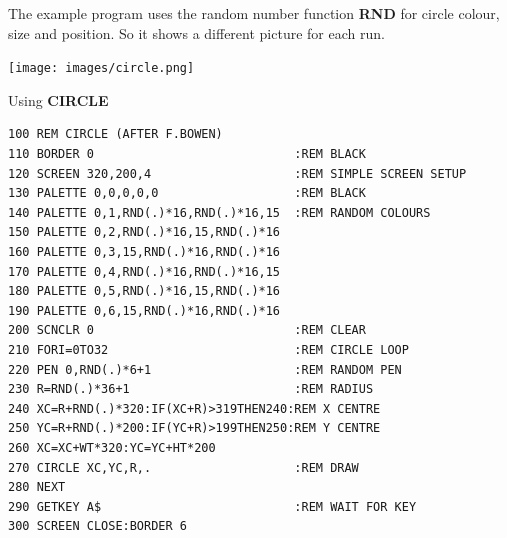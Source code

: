 \begin{description}[leftmargin=2cm,style=nextline]
               The example program uses the random number function
               {\bf RND} for circle colour, size and position.
               So it shows a different picture for each run.

\item \begin{center}\texttt{[image: images/circle.png]}\end{center}
\newpage

\item [Example:] Using {\bf CIRCLE}
\begin{tcolorbox}[colback=black,coltext=white]
\verbatimfont{\codefont}
\begin{verbatim}
100 REM CIRCLE (AFTER F.BOWEN)
110 BORDER 0                            :REM BLACK
120 SCREEN 320,200,4                    :REM SIMPLE SCREEN SETUP
130 PALETTE 0,0,0,0,0                   :REM BLACK
140 PALETTE 0,1,RND(.)*16,RND(.)*16,15  :REM RANDOM COLOURS
150 PALETTE 0,2,RND(.)*16,15,RND(.)*16
160 PALETTE 0,3,15,RND(.)*16,RND(.)*16
170 PALETTE 0,4,RND(.)*16,RND(.)*16,15
180 PALETTE 0,5,RND(.)*16,15,RND(.)*16
190 PALETTE 0,6,15,RND(.)*16,RND(.)*16
200 SCNCLR 0                            :REM CLEAR
210 FORI=0TO32                          :REM CIRCLE LOOP
220 PEN 0,RND(.)*6+1                    :REM RANDOM PEN
230 R=RND(.)*36+1                       :REM RADIUS
240 XC=R+RND(.)*320:IF(XC+R)>319THEN240:REM X CENTRE
250 YC=R+RND(.)*200:IF(YC+R)>199THEN250:REM Y CENTRE
260 XC=XC+WT*320:YC=YC+HT*200
270 CIRCLE XC,YC,R,.                    :REM DRAW
280 NEXT
290 GETKEY A$                           :REM WAIT FOR KEY
300 SCREEN CLOSE:BORDER 6
\end{verbatim}
\end{tcolorbox}
\end{description}


\newpage
